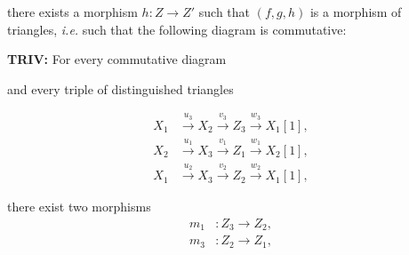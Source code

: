 %
\begingroup
\small
\setlength{\abovedisplayskip}{4pt plus 2pt minus 2pt}%
\setlength{\belowdisplayskip}{4pt plus 2pt minus 2pt}%

\noindent there exists a morphism $h\colon Z\longrightarrow Z'$ such that
$(f,g,h)$ is a morphism of triangles, \emph{i.e.} such that the following
diagram is commutative:

\begin{center}
\end{center}
\pagebreak[4]

\noindent\textbf{TRIV:}
For every commutative diagram

\begin{center}
\end{center}
and every triple of distinguished triangles

\[
  \begin{aligned}
    X_1 &\xrightarrow{u_3} X_2 \xrightarrow{v_3} Z_3
        \xrightarrow{w_3} X_1[1],\\
    X_2 &\xrightarrow{u_1} X_3 \xrightarrow{v_1} Z_1
        \xrightarrow{w_1} X_2[1],\\
    X_1 &\xrightarrow{u_2} X_3 \xrightarrow{v_2} Z_2
        \xrightarrow{w_2} X_1[1],
  \end{aligned}
\]

there exist two morphisms
\[
  \begin{aligned}
    m_1 &\colon Z_3\longrightarrow Z_2,\\
    m_3 &\colon Z_2\longrightarrow Z_1,
  \end{aligned}
\]


